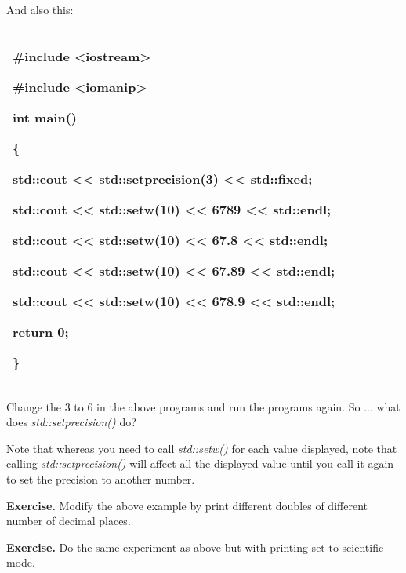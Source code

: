 \documentclass[
]{article}
\begin{document}
And also this:

\begin{longtable}[]{@{}l@{}}
\toprule
\endhead
\begin{minipage}[t]{0.97\columnwidth}\raggedright
\#include \textless iostream\textgreater{}

\#include \textless iomanip\textgreater{}

int main()

\{

std::cout \textless\textless{} std::setprecision(3) \textless\textless{}
std::fixed;

std::cout \textless\textless{} std::setw(10) \textless\textless{} 6789
\textless\textless{} std::endl;

std::cout \textless\textless{} std::setw(10) \textless\textless{} 67.8
\textless\textless{} std::endl;

std::cout \textless\textless{} std::setw(10) \textless\textless{} 67.89
\textless\textless{} std::endl;

std::cout \textless\textless{} std::setw(10) \textless\textless{} 678.9
\textless\textless{} std::endl;

return 0;

\}\strut
\end{minipage}\tabularnewline
\bottomrule
\end{longtable}

Change the 3 to 6 in the above programs and run the programs again. So
... what does \emph{std::setprecision()} do?

Note that whereas you need to call \emph{std::setw()} for each value
displayed, note that calling \emph{std::setprecision()} will affect all
the displayed value until you call it again to set the precision to
another number.

\textbf{Exercise.} Modify the above example by print different doubles
of different number of decimal places.

\textbf{Exercise.} Do the same experiment as above but with printing set
to scientific mode.
\end{document}
